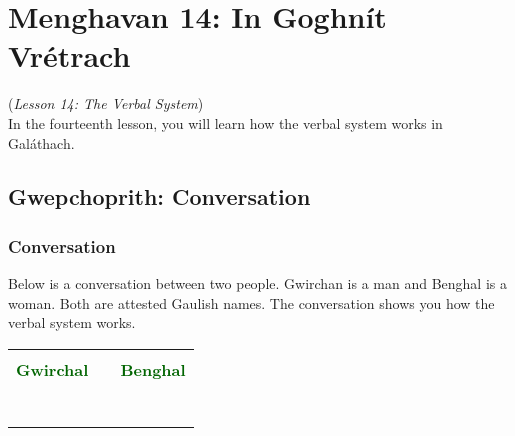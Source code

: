 \section{Menghavan 14: In Goghn\'{i}t Vr\'{e}trach}
(\textit{Lesson 14: The Verbal System})\\

In the fourteenth lesson, you will learn how the verbal system works in Gal\'{a}thach.

\subsection{Gwepchoprith: Conversation}
\subsubsection{Conversation}

Below is a conversation between two people. Gwirchan is a man and Benghal is a woman. Both are attested Gaulish names. The conversation shows you how the verbal system works.

\begin{table}[H]
\centering
    \begin{tabular}{cM{10.0cm}c}
     &  & \\
    \textcolor{darkgreen}{\textbf{Gwirchal}} &  & \textcolor{darkgreen}{\textbf{Benghal}}\\
     &  & \\
     &  & \\
     &  & \\
     &  & \\
     &  & \\
     &  & \\
     &  & 
    \end{tabular}
\end{table}

